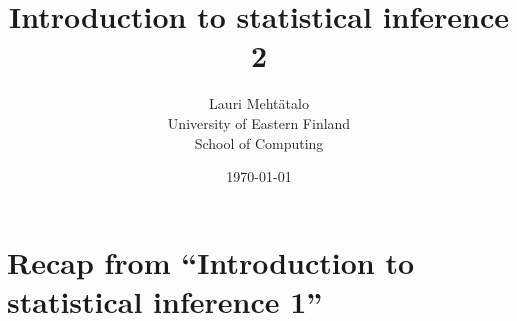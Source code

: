 \documentclass[10pt, twoside, a4paper]{book}
\theoremstyle{definition}
\begin{document}
\setlength{\baselineskip}{16pt}

\title{Introduction to statistical inference 2}

\author{Lauri Meht\"atalo\\
	   University of Eastern Finland \\ School of Computing
	   }

\date{\normalsize \today}
\maketitle
\tableofcontents



\mainmatter
{}

\chapter {Recap from ``Introduction to statistical inference 1''}
\end{document}
